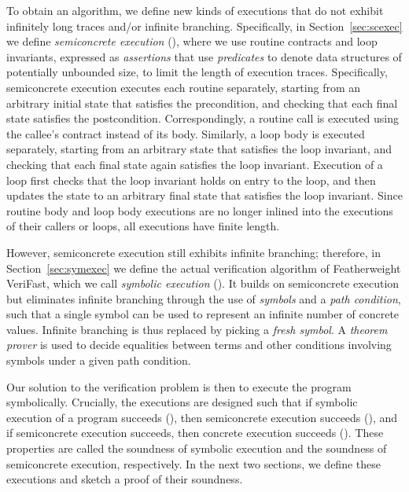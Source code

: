 \documentclass{CSML}
\theoremstyle{definition}\newtheorem{notation}[thm]{Notation}
\theoremstyle{plain}\newtheorem{satz}[thm]{Satz}
\begin{document}
To obtain an algorithm, we define new kinds of executions that 
do not exhibit infinitely long traces and/or infinite 
branching. Specifically, in Section~\ref{sec:scexec} we define 
\emph{semiconcrete execution} (), where we use routine contracts 
and loop invariants, expressed as \emph{assertions} that use 
\emph{predicates} to denote data structures of potentially 
unbounded size, to limit the length of execution traces. 
Specifically, semiconcrete execution executes each routine 
separately, starting from an arbitrary initial state that 
satisfies the precondition, and checking that each final state 
satisfies the postcondition. Correspondingly, a routine call is 
executed using the callee's contract instead of its body. 
Similarly, a loop body is executed separately, starting from an 
arbitrary state that satisfies the loop invariant, and checking 
that each final state again satisfies the loop invariant. 
Execution of a loop first checks that the loop invariant holds 
on entry to the loop, and then updates the state to an 
arbitrary final state that satisfies the loop invariant. Since 
routine body and loop body executions are no longer inlined 
into the executions of their callers or loops, all executions 
have finite length.

However, semiconcrete execution still exhibits infinite 
branching; therefore, in Section~\ref{sec:symexec} we define 
the actual verification algorithm of Featherweight VeriFast, 
which we call \emph{symbolic execution} (). It builds on semiconcrete execution but eliminates infinite 
branching through the use of \emph{symbols} and a \emph{path 
condition}, such that a single symbol can be used to represent 
an infinite number of concrete values. Infinite branching is 
thus replaced by picking a \emph{fresh symbol}. A \emph{theorem 
prover} is used to decide equalities between terms and other conditions involving 
symbols under a given path condition.

Our solution to the verification problem is then to execute the 
program symbolically. Crucially, the executions are designed 
such that if symbolic execution of a program succeeds (), then 
semiconcrete execution succeeds (), and if semiconcrete execution 
succeeds, then concrete execution succeeds (). These properties 
are called the soundness of symbolic execution and the 
soundness of semiconcrete execution, respectively. In the 
next two sections, we define these executions and sketch a 
proof of their soundness. 

\begin{defi}[Soundness]

\end{defi}
\end{document}
